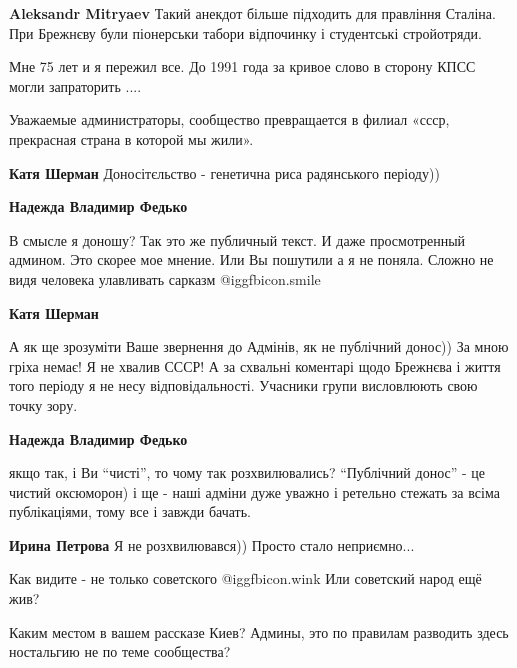 \begin{itemize}
\begin{itemize}
\textbf{Aleksandr Mitryaev} Такий анекдот більше підходить для правління Сталіна. При Брежнєву були піонерськи табори відпочинку і студентські стройотряди.

Мне 75 лет и я пережил все. До 1991 года за кривое слово в сторону КПСС могли запраторить ....
\end{itemize} %


Уважаемые администраторы, сообщество превращается в филиал «ссср, прекрасная
страна в которой мы жили».

\begin{itemize} %
\textbf{Катя Шерман} Доносітєльство - генетична риса радянського періоду))

\begin{itemize} %
\textbf{Надежда Владимир Федько} 

В смысле я доношу? Так это же публичный текст. И даже просмотренный админом.
Это скорее мое мнение. Или Вы пошутили а я не поняла. Сложно не видя человека
улавливать сарказм  @igg{fbicon.smile} 


\textbf{Катя Шерман} 

А як ще зрозуміти Ваше звернення до Адмінів, як не публічний донос)) За мною
гріха немає! Я не хвалив СССР! А за схвальні коментарі щодо Брежнєва і життя
того періоду я не несу відповідальності. Учасники групи висловлюють свою точку
зору.


\textbf{Надежда Владимир Федько} 

якщо так, і Ви \enquote{чисті}, то чому так розхвилювались? \enquote{Публічний донос} - це
чистий оксюморон) і ще - наші адміни дуже уважно і ретельно стежать за всіма
публікаціями, тому все і завжди бачать.


\textbf{Ирина Петрова} Я не розхвилювався)) Просто стало неприємно...
\end{itemize} %

Как видите - не только советского  @igg{fbicon.wink}  Или советский народ ещё жив?

\end{itemize} %


Каким местом в вашем рассказе Киев? Админы, это по правилам разводить здесь
ностальгию не по теме сообщества?


\end{itemize}
